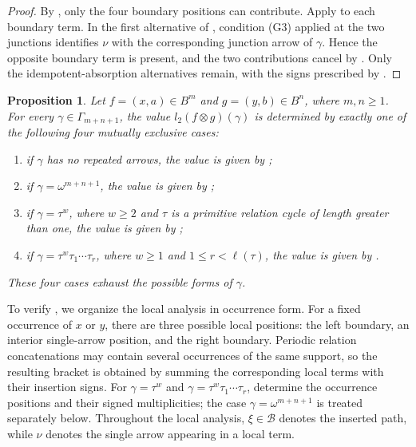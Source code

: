 \documentclass[11pt,a4paper,reqno]{amsart}
\newcommand{\mB}{\mathcal B}
\newcommand{\para}[2]{(#1,#2)}
\theoremstyle{plain}
\newtheorem{proposition}[proposition]{Proposition}
\theoremstyle{definition}
\numberwithin{equation}{section}
\begin{document}
	\begin{proof}
		By , only the four boundary
		positions can contribute.  Apply
		 to each boundary term.  In the
		first alternative of , condition
		\textup{(G3)} applied at the two junctions identifies $\nu$ with the
		corresponding junction arrow of $\gamma$.  Hence the opposite boundary
		term is present, and the two contributions cancel by
		.  Only the idempotent-absorption
		alternatives remain, with the signs prescribed by .
	\end{proof}
	\begin{proposition}
		\label{prop:positive-positive-classification}
		Let $f=\para{x}{a}\in B^m$ and $g=\para{y}{b}\in B^n$, where
		$m,n\geq1$.  For every $\gamma\in\Gamma_{m+n+1}$, the value
		$l_2(f\otimes g)(\gamma)$ is determined by exactly one of the
		following four mutually exclusive cases:
		\begin{enumerate}
			\item if $\gamma$ has no repeated arrows, the value is given by
			;
			\item if $\gamma=\omega^{m+n+1}$, the value is given by
			;
			\item if $\gamma=\tau^w$, where $w\geq2$ and $\tau$ is a primitive
			relation cycle of length greater than one, the value is given by
			;
			\item if $\gamma=\tau^w\tau_1\cdots\tau_r$, where $w\geq1$ and
			$1\leq r<\ell(\tau)$, the value is given by
			.
		\end{enumerate}
		These four cases exhaust the possible forms of $\gamma$.
	\end{proposition}
	
	To verify , we organize the local
	analysis in occurrence form.  For a fixed occurrence of $x$ or $y$, there are
	three possible local positions: the left boundary, an interior single-arrow
	position, and the right boundary.  Periodic relation concatenations may
	contain several occurrences of the same support, so the resulting bracket is
	obtained by summing the corresponding local terms with their insertion signs.
	For $\gamma=\tau^w$ and $\gamma=\tau^w\tau_1\cdots\tau_r$,
	 determine the
	occurrence positions and their signed multiplicities; the case
	$\gamma=\omega^{m+n+1}$ is treated separately below.  Throughout the local
	analysis, $\xi\in\mB$ denotes the inserted path, while $\nu$ denotes the
	single arrow appearing in a local term.
	
\end{document}
